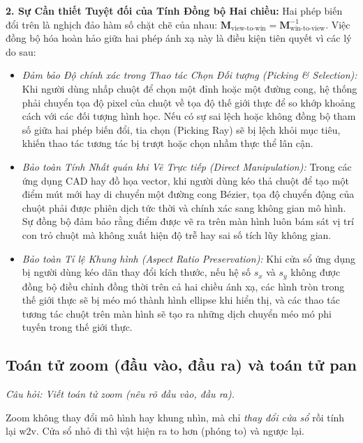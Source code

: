 \textbf{2. Sự Cần thiết Tuyệt đối của Tính Đồng bộ Hai chiều:}
Hai phép biến đổi trên là nghịch đảo hàm số chặt chẽ của nhau: $\mathbf{M}_{\text{view-to-win}} = \mathbf{M}_{\text{win-to-view}}^{-1}$. Việc đồng bộ hóa hoàn hảo giữa hai phép ánh xạ này là điều kiện tiên quyết vì các lý do sau:
\begin{itemize}
    \item \textit{Đảm bảo Độ chính xác trong Thao tác Chọn Đối tượng (Picking \& Selection):} Khi người dùng nhấp chuột để chọn một đỉnh hoặc một đường cong, hệ thống phải chuyển tọa độ pixel của chuột về tọa độ thế giới thực để so khớp khoảng cách với các đối tượng hình học. Nếu có sự sai lệch hoặc không đồng bộ tham số giữa hai phép biến đổi, tia chọn (Picking Ray) sẽ bị lệch khỏi mục tiêu, khiến thao tác tương tác bị trượt hoặc chọn nhầm thực thể lân cận.
    \item \textit{Bảo toàn Tính Nhất quán khi Vẽ Trực tiếp (Direct Manipulation):} Trong các ứng dụng CAD hay đồ họa vector, khi người dùng kéo thả chuột để tạo một điểm mút mới hay di chuyển một đường cong Bézier, tọa độ chuyển động của chuột phải được phiên dịch tức thời và chính xác sang không gian mô hình. Sự đồng bộ đảm bảo rằng điểm được vẽ ra trên màn hình luôn bám sát vị trí con trỏ chuột mà không xuất hiện độ trễ hay sai số tích lũy không gian.
    \item \textit{Bảo toàn Tỉ lệ Khung hình (Aspect Ratio Preservation):} Khi cửa sổ ứng dụng bị người dùng kéo dãn thay đổi kích thước, nếu hệ số $s_x$ và $s_y$ không được đồng bộ điều chỉnh đồng thời trên cả hai chiều ánh xạ, các hình tròn trong thế giới thực sẽ bị méo mó thành hình ellipse khi hiển thị, và các thao tác tương tác chuột trên màn hình sẽ tạo ra những dịch chuyển méo mó phi tuyến trong thế giới thực.
\end{itemize}

\subsection{Toán tử zoom (đầu vào, đầu ra) và toán tử pan}
\label{subsec:w6_zoom}

\textit{Câu hỏi: Viết toán tử zoom (nêu rõ đầu vào, đầu ra).}

Zoom không thay đổi mô hình hay khung nhìn, mà chỉ \emph{thay đổi cửa sổ} rồi tính lại w2v. Cửa sổ nhỏ đi thì vật hiện ra to hơn (phóng to) và ngược lại.

